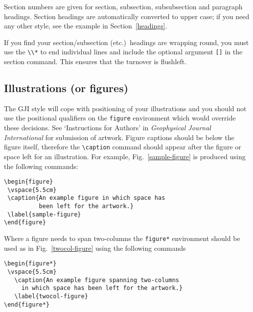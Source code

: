 Section numbers are given for section, subsection, subsubsection and paragraph
headings. Section headings are automatically converted to upper case; if you
need any other style, see the example in Section~\ref{headings}.

If you find your section/subsection (etc.)\ headings are wrapping round, you
must use the \verb"\\*" to end individual lines and include the optional
argument \verb"[]" in the section command. This ensures that the turnover is
flushleft.

\subsection{Illustrations (or figures)}

\begin{figure*}
 \vspace{5.5cm}
  \caption{An example figure spanning two-columns in which space has been left
  for the artwork.}\label{twocol-figure}
\end{figure*}

The GJI style will cope with positioning of your illustrations and
you should not use the positional qualifiers on the
\verb"figure" environment which would override these decisions. See
`Instructions for Authors' in {\em Geophysical Journal International\/}
for submission of
artwork. Figure captions should be below the figure itself, therefore
the \verb"\caption" command should appear after the figure or space
left for an illustration. For example, Fig.~\ref{sample-figure} is
produced using the following commands:
\begin{verbatim}
\begin{figure}
 \vspace{5.5cm}
 \caption{An example figure in which space has
          been left for the artwork.}
 \label{sample-figure}
\end{figure}
\end{verbatim}

Where a figure needs to span two-columns the \verb"figure*" environment
should be used as in  Fig.~\ref{twocol-figure} using the following commands
\begin{verbatim}
\begin{figure*}
 \vspace{5.5cm}
   \caption{An example figure spanning two-columns
     in which space has been left for the artwork.}
   \label{twocol-figure}
\end{figure*}
\end{verbatim}

